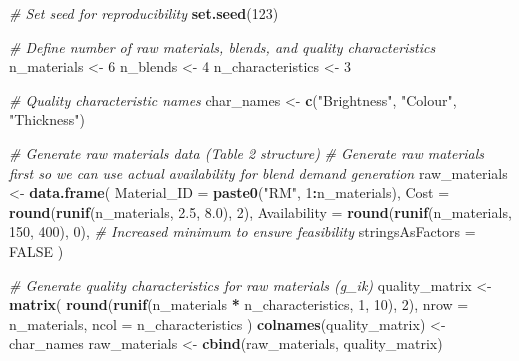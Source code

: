 \documentclass[
]{article}
\newenvironment{Shaded}{\begin{snugshade}}{\end{snugshade}}
\newcommand{\AttributeTok}[1]{\textcolor[rgb]{0.13,0.29,0.53}{#1}}
\newcommand{\CommentTok}[1]{\textcolor[rgb]{0.56,0.35,0.01}{\textit{#1}}}
\newcommand{\ConstantTok}[1]{\textcolor[rgb]{0.56,0.35,0.01}{#1}}
\newcommand{\DecValTok}[1]{\textcolor[rgb]{0.00,0.00,0.81}{#1}}
\newcommand{\FloatTok}[1]{\textcolor[rgb]{0.00,0.00,0.81}{#1}}
\newcommand{\FunctionTok}[1]{\textcolor[rgb]{0.13,0.29,0.53}{\textbf{#1}}}
\newcommand{\NormalTok}[1]{#1}
\newcommand{\OtherTok}[1]{\textcolor[rgb]{0.56,0.35,0.01}{#1}}
\newcommand{\SpecialCharTok}[1]{\textcolor[rgb]{0.81,0.36,0.00}{\textbf{#1}}}
\newcommand{\StringTok}[1]{\textcolor[rgb]{0.31,0.60,0.02}{#1}}
\begin{document}
\begin{Shaded}
\begin{Highlighting}[]
\CommentTok{\# Set seed for reproducibility}
\FunctionTok{set.seed}\NormalTok{(}\DecValTok{123}\NormalTok{)}

\CommentTok{\# Define number of raw materials, blends, and quality characteristics}
\NormalTok{n\_materials }\OtherTok{\textless{}{-}} \DecValTok{6}
\NormalTok{n\_blends }\OtherTok{\textless{}{-}} \DecValTok{4}
\NormalTok{n\_characteristics }\OtherTok{\textless{}{-}} \DecValTok{3}

\CommentTok{\# Quality characteristic names}
\NormalTok{char\_names }\OtherTok{\textless{}{-}} \FunctionTok{c}\NormalTok{(}\StringTok{"Brightness"}\NormalTok{, }\StringTok{"Colour"}\NormalTok{, }\StringTok{"Thickness"}\NormalTok{)}

\CommentTok{\# Generate raw materials data (Table 2 structure)}
\CommentTok{\# Generate raw materials first so we can use actual availability for blend demand generation}
\NormalTok{raw\_materials }\OtherTok{\textless{}{-}} \FunctionTok{data.frame}\NormalTok{(}
  \AttributeTok{Material\_ID =} \FunctionTok{paste0}\NormalTok{(}\StringTok{"RM"}\NormalTok{, }\DecValTok{1}\SpecialCharTok{:}\NormalTok{n\_materials),}
  \AttributeTok{Cost =} \FunctionTok{round}\NormalTok{(}\FunctionTok{runif}\NormalTok{(n\_materials, }\FloatTok{2.5}\NormalTok{, }\FloatTok{8.0}\NormalTok{), }\DecValTok{2}\NormalTok{),}
  \AttributeTok{Availability =} \FunctionTok{round}\NormalTok{(}\FunctionTok{runif}\NormalTok{(n\_materials, }\DecValTok{150}\NormalTok{, }\DecValTok{400}\NormalTok{), }\DecValTok{0}\NormalTok{),  }\CommentTok{\# Increased minimum to ensure feasibility}
  \AttributeTok{stringsAsFactors =} \ConstantTok{FALSE}
\NormalTok{)}

\CommentTok{\# Generate quality characteristics for raw materials (g\_ik)}
\NormalTok{quality\_matrix }\OtherTok{\textless{}{-}} \FunctionTok{matrix}\NormalTok{(}
  \FunctionTok{round}\NormalTok{(}\FunctionTok{runif}\NormalTok{(n\_materials }\SpecialCharTok{*}\NormalTok{ n\_characteristics, }\DecValTok{1}\NormalTok{, }\DecValTok{10}\NormalTok{), }\DecValTok{2}\NormalTok{),}
  \AttributeTok{nrow =}\NormalTok{ n\_materials,}
  \AttributeTok{ncol =}\NormalTok{ n\_characteristics}
\NormalTok{)}
\FunctionTok{colnames}\NormalTok{(quality\_matrix) }\OtherTok{\textless{}{-}}\NormalTok{ char\_names}
\NormalTok{raw\_materials }\OtherTok{\textless{}{-}} \FunctionTok{cbind}\NormalTok{(raw\_materials, quality\_matrix)}


\end{Highlighting}
\end{Shaded}
\end{document}
